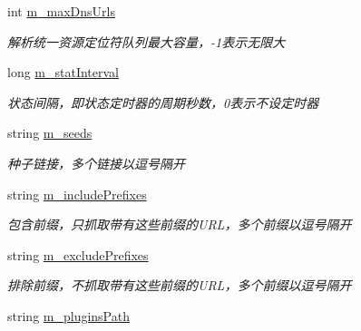 \begin{DoxyCompactItemize}
int \hyperlink{class_configurator_a3d64cd25dbfee1edf4d26fd642b629f3}{m\+\_\+max\+Dns\+Urls}
\begin{DoxyCompactList}\small\item\em 解析统一资源定位符队列最大容量，-\/1表示无限大 \end{DoxyCompactList}\item 
\mbox{\label{class_configurator_abf473e476241dd69d7a0b3373f35f8dd}} 
long \hyperlink{class_configurator_abf473e476241dd69d7a0b3373f35f8dd}{m\+\_\+stat\+Interval}
\begin{DoxyCompactList}\small\item\em 状态间隔，即状态定时器的周期秒数，0表示不设定时器 \end{DoxyCompactList}\item 
\mbox{\label{class_configurator_ac9c2b18d9fba05948495f793fdf66124}} 
string \hyperlink{class_configurator_ac9c2b18d9fba05948495f793fdf66124}{m\+\_\+seeds}
\begin{DoxyCompactList}\small\item\em 种子链接，多个链接以逗号隔开 \end{DoxyCompactList}\item 
\mbox{\label{class_configurator_a26310ca9cf9ee2757b6e5e145205d4b7}} 
string \hyperlink{class_configurator_a26310ca9cf9ee2757b6e5e145205d4b7}{m\+\_\+include\+Prefixes}
\begin{DoxyCompactList}\small\item\em 包含前缀，只抓取带有这些前缀的\+U\+R\+L，多个前缀以逗号隔开 \end{DoxyCompactList}\item 
\mbox{\label{class_configurator_a4a88e7daaeffed59739ed8ec7619f3b7}} 
string \hyperlink{class_configurator_a4a88e7daaeffed59739ed8ec7619f3b7}{m\+\_\+exclude\+Prefixes}
\begin{DoxyCompactList}\small\item\em 排除前缀，不抓取带有这些前缀的\+U\+R\+L，多个前缀以逗号隔开 \end{DoxyCompactList}\item 
\mbox{\label{class_configurator_ad85f230b1fb317a9067769d8ab64805d}} 
string \hyperlink{class_configurator_ad85f230b1fb317a9067769d8ab64805d}{m\+\_\+plugins\+Path}

\end{DoxyCompactItemize}
